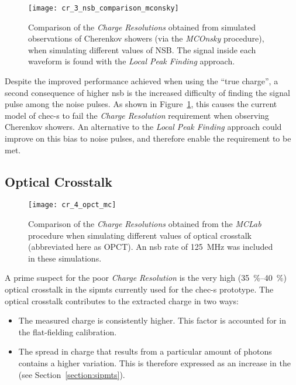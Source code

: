 \begin{figure}
	\centering
    \texttt{[image: cr\_3\_nsb\_comparison\_mconsky]} 
	\caption[Comparison of the \textit{Charge Resolution} at two different NSBs when observing Cherenkov showers (via the\textit{MCOnsky} procedure).]{Comparison of the \textit{Charge Resolutions} obtained from simulated observations of Cherenkov showers (via the \textit{MCOnsky} procedure), when simulating different values of NSB. The signal inside each waveform is found with the \textit{Local Peak Finding} approach.}
	\label{fig:cr_3_nsb_comparison_mconsky}
\end{figure}

Despite the improved performance achieved when using the ``true charge'', a second consequence of higher \gls{nsb} is the increased difficulty of finding the signal pulse among the noise pulses. As shown in Figure~\ref{fig:cr_3_nsb_comparison_mconsky}, this causes the current model of \gls{chec-s} to fail the \textit{Charge Resolution} requirement when observing Cherenkov showers. An alternative to the \textit{Local Peak Finding} approach could improve on this bias to noise pulses, and therefore enable the requirement to be met.

\subsection{Optical Crosstalk}

\begin{figure}[H]
	\centering
    \texttt{[image: cr\_4\_opct\_mc]} 
	\caption[Comparison of the \textit{Charge Resolution} at different values of optical crosstalk.]{Comparison of the \textit{Charge Resolutions} obtained from the \textit{MCLab} procedure when simulating different values of optical crosstalk (abbreviated here as OPCT). An \gls{nsb} rate of \SI{125}{MHz} was included in these simulations.}
	\label{fig:cr_4_opct_mc}
\end{figure}

A prime suspect for the poor \textit{Charge Resolution} is the very high (\SIrange{35}{40}{\percent}) optical crosstalk in the \glspl{sipmt} currently used for the \gls{chec-s} prototype. The optical crosstalk contributes to the extracted charge in two ways: 
\begin{itemize}
\item The measured charge is consistently higher. This factor is accounted for in the flat-fielding calibration.
\item The spread in charge that results from a particular amount of photons contains a higher variation. This is therefore expressed as an increase in the  (see Section~\ref{section:sipmts}).
\end{itemize}

